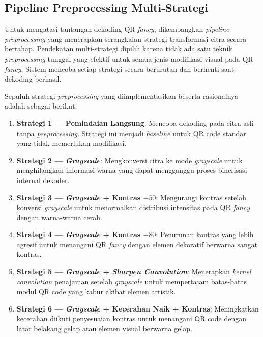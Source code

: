 \documentclass[conference]{IEEEtran}
\begin{document}
\subsection{Pipeline Preprocessing Multi-Strategi}

Untuk mengatasi tantangan dekoding QR \textit{fancy}, dikembangkan \textit{pipeline preprocessing} yang menerapkan serangkaian strategi transformasi citra secara bertahap. Pendekatan multi-strategi dipilih karena tidak ada satu teknik \textit{preprocessing} tunggal yang efektif untuk semua jenis modifikasi visual pada QR \textit{fancy}. Sistem mencoba setiap strategi secara berurutan dan berhenti saat dekoding berhasil.

Sepuluh strategi \textit{preprocessing} yang diimplementasikan beserta rasionalnya adalah sebagai berikut:

\begin{enumerate}[label=\arabic*)]
    \item \textbf{Strategi 1 --- Pemindaian Langsung}: Mencoba dekoding pada citra asli tanpa \textit{preprocessing}. Strategi ini menjadi \textit{baseline} untuk QR code standar yang tidak memerlukan modifikasi.
    
    \item \textbf{Strategi 2 --- \textit{Grayscale}}: Mengkonversi citra ke mode \textit{grayscale} untuk menghilangkan informasi warna yang dapat mengganggu proses binerisasi internal dekoder.
    
    \item \textbf{Strategi 3 --- \textit{Grayscale} + Kontras $-50$}: Mengurangi kontras setelah konversi \textit{grayscale} untuk menormalkan distribusi intensitas pada QR \textit{fancy} dengan warna-warna cerah.
    
    \item \textbf{Strategi 4 --- \textit{Grayscale} + Kontras $-80$}: Penurunan kontras yang lebih agresif untuk menangani QR \textit{fancy} dengan elemen dekoratif berwarna sangat kontras.
    
    \item \textbf{Strategi 5 --- \textit{Grayscale} + \textit{Sharpen Convolution}}: Menerapkan \textit{kernel convolution} penajaman setelah \textit{grayscale} untuk mempertajam batas-batas modul QR code yang kabur akibat elemen artistik.
    
    \item \textbf{Strategi 6 --- \textit{Grayscale} + Kecerahan Naik + Kontras}: Meningkatkan kecerahan diikuti penyesuaian kontras untuk menangani QR code dengan latar belakang gelap atau elemen visual berwarna gelap.
    

\end{enumerate}
\end{document}
